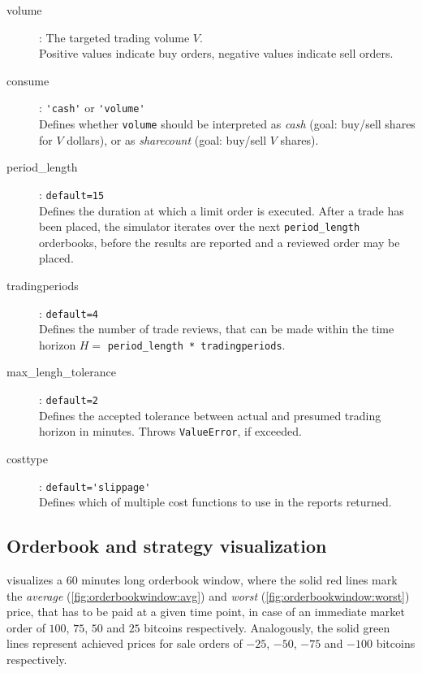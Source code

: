 \begin{description}
\item[volume] : The targeted trading volume $V$.\\
Positive values indicate buy orders, negative values indicate sell orders.
\item[consume] : \lstinline!'cash'! or \lstinline!'volume'!\\
Defines whether \lstinline!volume! should be interpreted as \emph{cash} (goal: buy/sell shares for $V$ dollars), or as \emph{sharecount} (goal: buy/sell $V$ shares).
\item[period\_length] : \lstinline!default=15!\\
Defines the duration at which a limit order is executed. After a trade has been placed, the simulator iterates over the next \lstinline!period_length! orderbooks, before the results are reported and a reviewed order may be placed.

\item[tradingperiods] : \lstinline!default=4!\\
Defines the number of trade reviews, that can be made within the time horizon $H =$ \lstinline!period_length * tradingperiods!.

\item[max\_lengh\_tolerance] : \lstinline!default=2!\\
Defines the accepted tolerance between actual and presumed trading horizon in minutes. Throws \lstinline!ValueError!, if exceeded.

\item[costtype] : \lstinline!default='slippage'!\\
Defines which of multiple cost functions to use in the reports returned. 
\end{description}

\subsection{Orderbook and strategy visualization}

 visualizes a 60 minutes long orderbook window, where the solid red lines mark the \emph{average} (\ref{fig:orderbookwindow:avg}) and \emph{worst} (\ref{fig:orderbookwindow:worst}) price, that has to be paid at a given time point, in case of an immediate market order of $100$, $75$, $50$ and $25$ bitcoins respectively. Analogously, the solid green lines represent achieved prices for sale orders of $-25$, $-50$, $-75$ and $-100$ bitcoins respectively.\\

